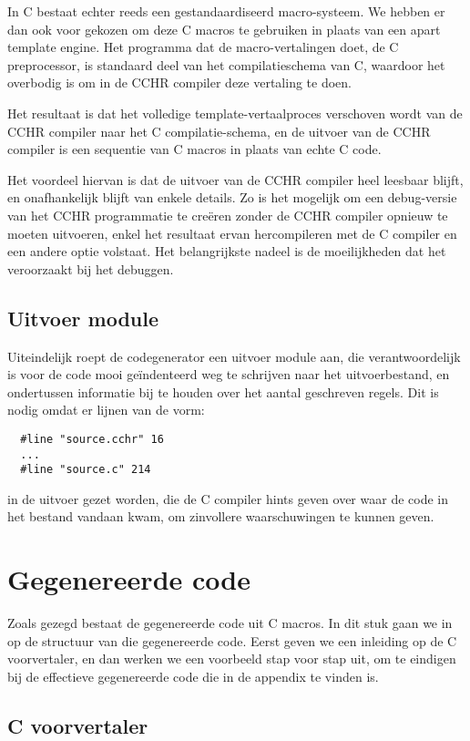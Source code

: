 In C bestaat echter reeds een gestandaardiseerd macro-systeem. We hebben er dan ook voor gekozen om deze C macros te gebruiken in plaats van een apart template engine. Het programma dat de macro-vertalingen doet, de C preprocessor, is standaard deel van het compilatieschema van C, waardoor het overbodig is om in de CCHR compiler deze vertaling te doen.

Het resultaat is dat het volledige template-vertaalproces verschoven wordt van de CCHR compiler naar het C compilatie-schema, en de uitvoer van de CCHR compiler is een sequentie van C macros in plaats van echte C code.

Het voordeel hiervan is dat de uitvoer van de CCHR compiler heel leesbaar blijft, en onafhankelijk blijft van enkele details. Zo is het mogelijk om een debug-versie van het CCHR programmatie te cre\"eren zonder de CCHR compiler opnieuw te moeten uitvoeren, enkel het resultaat ervan hercompileren met de C compiler en een andere optie volstaat. Het belangrijkste nadeel is de moeilijkheden dat het veroorzaakt bij het debuggen. 

\subsection{Uitvoer module}

Uiteindelijk roept de codegenerator een uitvoer module aan, die verantwoordelijk is voor de code mooi ge\"indenteerd weg te schrijven naar het uitvoerbestand, en ondertussen informatie bij te houden over het aantal geschreven regels. Dit is nodig omdat er lijnen van de vorm: \begin{Verbatim}
  #line "source.cchr" 16
  ...
  #line "source.c" 214
\end{Verbatim}
in de uitvoer gezet worden, die de C compiler hints geven over waar de code in het bestand vandaan kwam, om zinvollere waarschuwingen te kunnen geven. 

\section{Gegenereerde code} \label{sec:impl-code}

Zoals gezegd bestaat de gegenereerde code uit C macros. In dit stuk gaan we in op de structuur van die gegenereerde code.
Eerst geven we een inleiding op de C voorvertaler, en dan werken we een voorbeeld stap voor stap uit, om te eindigen bij de effectieve gegenereerde code die in de appendix te vinden is.

\subsection{C voorvertaler}

